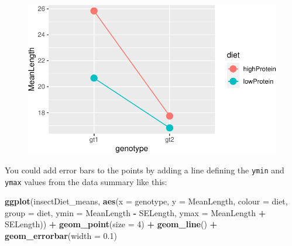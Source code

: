 \documentclass[
  a4paperpaper,
]{book}
\newenvironment{Shaded}{\begin{snugshade}}{\end{snugshade}}
\newcommand{\DataTypeTok}[1]{\textcolor[rgb]{0.13,0.29,0.53}{#1}}
\newcommand{\DecValTok}[1]{\textcolor[rgb]{0.00,0.00,0.81}{#1}}
\newcommand{\FloatTok}[1]{\textcolor[rgb]{0.00,0.00,0.81}{#1}}
\newcommand{\KeywordTok}[1]{\textcolor[rgb]{0.13,0.29,0.53}{\textbf{#1}}}
\newcommand{\NormalTok}[1]{#1}
\newcommand{\OperatorTok}[1]{\textcolor[rgb]{0.81,0.36,0.00}{\textbf{#1}}}
\newcommand{\StringTok}[1]{\textcolor[rgb]{0.31,0.60,0.02}{#1}}
\begin{document}
\begin{figure}[ht]

{\centering \includegraphics{BB852_files/figure-latex/interactionPlot-1} 

}

\end{figure}

You could add error bars to the points by adding a line defining the \texttt{ymin} and \texttt{ymax} values from the data summary like this:

\begin{Shaded}
\begin{Highlighting}[]
\KeywordTok{ggplot}\NormalTok{(insectDiet\_means, }
       \KeywordTok{aes}\NormalTok{(}\DataTypeTok{x =}\NormalTok{ genotype, }\DataTypeTok{y =}\NormalTok{ MeanLength, }\DataTypeTok{colour =}\NormalTok{ diet, }\DataTypeTok{group =}\NormalTok{ diet,}
           \DataTypeTok{ymin =}\NormalTok{ MeanLength }\OperatorTok{{-}}\StringTok{ }\NormalTok{SELength, }\DataTypeTok{ymax =}\NormalTok{ MeanLength }\OperatorTok{+}\StringTok{ }\NormalTok{SELength)) }\OperatorTok{+}
\StringTok{  }\KeywordTok{geom\_point}\NormalTok{(}\DataTypeTok{size =} \DecValTok{4}\NormalTok{) }\OperatorTok{+}\StringTok{ }
\StringTok{  }\KeywordTok{geom\_line}\NormalTok{() }\OperatorTok{+}\StringTok{ }
\StringTok{  }\KeywordTok{geom\_errorbar}\NormalTok{(}\DataTypeTok{width =} \FloatTok{0.1}\NormalTok{)}
\end{Highlighting}
\end{Shaded}
\end{document}
